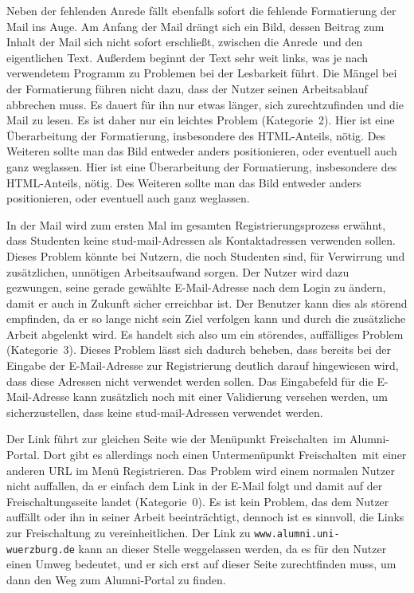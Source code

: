 {
Neben der fehlenden Anrede fällt ebenfalls sofort die fehlende Formatierung der Mail ins Auge. Am Anfang der Mail drängt sich ein Bild, dessen Beitrag zum Inhalt der Mail sich nicht sofort erschließt, zwischen die \glqq Anrede\grqq ~und den eigentlichen Text. Außerdem beginnt der Text sehr weit links, was je nach verwendetem Programm zu Problemen bei der Lesbarkeit führt.
}
{
Die Mängel bei der Formatierung führen nicht dazu, dass der Nutzer seinen Arbeitsablauf abbrechen muss. Es dauert für ihn nur etwas länger, sich zurechtzufinden und die Mail zu lesen. Es ist daher nur ein leichtes Problem (Kategorie~2).
}
{
Hier ist eine Überarbeitung der Formatierung, insbesondere des HTML-Anteils, nötig. Des Weiteren sollte man das Bild entweder anders positionieren, oder eventuell auch ganz weglassen.
Hier ist eine Überarbeitung der Formatierung, insbesondere des HTML-Anteils, nötig. Des Weiteren sollte man das Bild entweder anders positionieren, oder eventuell auch ganz weglassen.
}
\label{prob:frei:mailformat}

{
In der Mail wird zum ersten Mal im gesamten Registrierungsprozess erwähnt, dass Studenten keine stud\hbox{-}mail-Adressen als Kontaktadressen verwenden sollen.
}
{
Dieses Problem könnte bei Nutzern, die noch Studenten sind, für Verwirrung und zusätzlichen, unnötigen Arbeitsaufwand sorgen. Der Nutzer wird dazu gezwungen, seine gerade gewählte E\hbox{-}Mail-Adresse nach dem Login zu ändern, damit er auch in Zukunft sicher erreichbar ist. Der Benutzer kann dies als störend empfinden, da er so lange nicht sein Ziel verfolgen kann und durch die zusätzliche Arbeit abgelenkt wird. Es handelt sich also um ein störendes, auffälliges Problem (Kategorie~3).
}
{
Dieses Problem lässt sich dadurch beheben, dass bereits bei der Eingabe der E\hbox{-}Mail-Adresse zur Registrierung deutlich darauf hingewiesen wird, dass diese Adressen nicht verwendet werden sollen. Das Eingabefeld für die E\hbox{-}Mail-Adresse kann zusätzlich noch mit einer Validierung versehen werden, um sicherzustellen, dass keine stud\hbox{-}mail-Adressen verwendet werden.
}
\label{prob:frei:studmail}

{
Der Link führt zur gleichen Seite wie der Menüpunkt \glqq Freischalten\grqq ~im Alumni-Portal. Dort gibt es allerdings noch einen Untermenüpunkt \glqq Freischalten\grqq ~mit einer anderen URL im Menü  \glqq Registrieren\grqq.
}
{
Das Problem wird einem normalen Nutzer nicht auffallen, da er einfach dem Link in der E\hbox{-}Mail folgt und damit auf der Freischaltungsseite landet (Kategorie~0).
}
{
Es ist kein Problem, das dem Nutzer auffällt oder ihn in seiner Arbeit beeinträchtigt, dennoch ist es sinnvoll, die Links zur Freischaltung zu vereinheitlichen. Der Link zu \texttt{www.alumni.uni-wuerzburg.de} kann an dieser Stelle weggelassen werden, da es für den Nutzer einen Umweg bedeutet, und er sich erst auf dieser Seite zurechtfinden muss, um dann den Weg zum Alumni-Portal zu finden.
}
\label{prob:frei:link}

